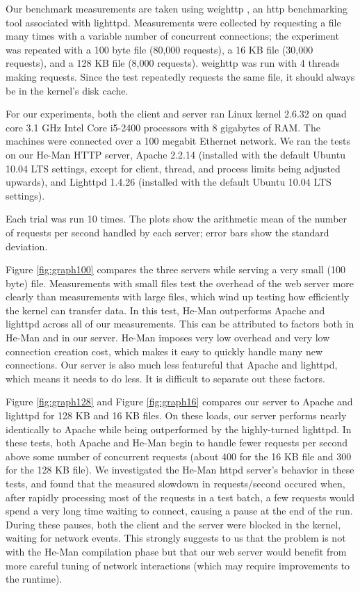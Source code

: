 \documentclass[preprint]{sigplanconf}
\begin{document}
Our benchmark measurements are taken using weighttp \cite{weighttp}, an http
benchmarking tool associated with lighttpd.  Measurements were collected by
requesting a file many times with a variable number of concurrent connections;
the experiment was repeated with a 100 byte file (80,000 requests), a 16 KB file
(30,000 requests), and a 128 KB file (8,000 requests). weighttp was run with 4
threads making requests. Since the test repeatedly requests the same file, it
should always be in the kernel's disk cache.

For our experiments, both the client and server ran Linux kernel 2.6.32 on quad
core 3.1 GHz Intel Core i5-2400 processors with 8 gigabytes of RAM. The machines
were connected over a 100 megabit Ethernet network. We ran the tests on our
He-Man HTTP server, Apache 2.2.14 (installed with the default Ubuntu 10.04 LTS
settings, except for client, thread, and process limits being adjusted upwards),
and Lighttpd 1.4.26 (installed with the default Ubuntu 10.04 LTS settings).

Each trial was run 10 times. The plots show the arithmetic mean of the number of
requests per second handled by each server; error bars show the standard
deviation.


Figure \ref{fig:graph100} compares the three servers while serving a
very small (100 byte) file. Measurements with small files test the
overhead of the web server more clearly than measurements with large
files, which wind up testing how efficiently the kernel can transfer
data. In this test, He-Man outperforms Apache and lighttpd across all
of our measurements. This can be attributed to factors both in He-Man
and in our server. He-Man imposes very low overhead and very low
connection creation cost, which makes it easy to quickly handle many
new connections. Our server is also much less featureful that Apache
and lighttpd, which means it needs to do less. It is difficult to
separate out these factors.

Figure \ref{fig:graph128} and Figure \ref{fig:graph16} compares our
server to Apache and lighttpd for 128 KB and 16 KB files. On these
loads, our server performs nearly identically to Apache while being
outperformed by the highly-turned lighttpd. In these tests, both
Apache and He-Man begin to handle fewer requests per second above some
number of concurrent requests (about 400 for the 16 KB file and 300
for the 128 KB file). We investigated the He-Man httpd server's
behavior in these tests, and found that the measured slowdown in
requests/second occured when, after rapidly processing most of the
requests in a test batch, a few requests would spend a very long time
waiting to connect, causing a pause at the end of the run. During
these pauses, both the client and the server were blocked in the
kernel, waiting for network events. This strongly suggests to us that
the problem is not with the He-Man compilation phase but that our web
server would benefit from more careful tuning of network interactions
(which may require improvements to the runtime).
\end{document}

